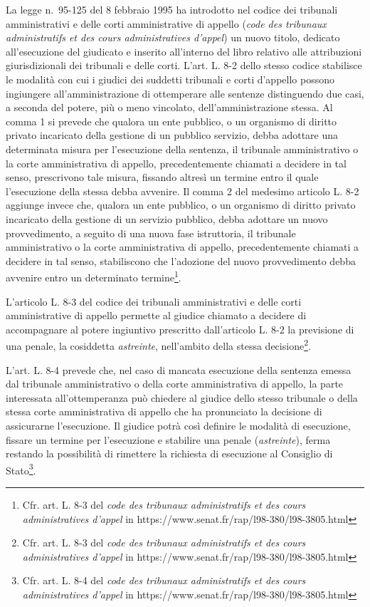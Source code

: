 \documentclass[12pt,it,a4paper,]{report}
\begin{document}
La legge n.~95-125 del 8 febbraio 1995 ha introdotto nel codice dei
tribunali amministrativi e delle corti amministrative di appello
(\emph{code des tribunaux administratifs et des cours administratives
d'appel}) un nuovo titolo, dedicato all'esecuzione del giudicato e
inserito all'interno del libro relativo alle attribuzioni
giurisdizionali dei tribunali e delle corti. L'art. L. 8-2 dello stesso
codice stabilisce le modalità con cui i giudici dei suddetti tribunali e
corti d'appello possono ingiungere all'amministrazione di ottemperare
alle sentenze distinguendo due casi, a seconda del potere, più o meno
vincolato, dell'amministrazione stessa. Al comma 1 si prevede che
qualora un ente pubblico, o un organismo di diritto privato incaricato
della gestione di un pubblico servizio, debba adottare una determinata
misura per l'esecuzione della sentenza, il tribunale amministrativo o la
corte amministrativa di appello, precedentemente chiamati a decidere in
tal senso, prescrivono tale misura, fissando altresì un termine entro il
quale l'esecuzione della stessa debba avvenire. Il comma 2 del medesimo
articolo L. 8-2 aggiunge invece che, qualora un ente pubblico, o un
organismo di diritto privato incaricato della gestione di un servizio
pubblico, debba adottare un nuovo provvedimento, a seguito di una nuova
fase istruttoria, il tribunale amministrativo o la corte amministrativa
di appello, precedentemente chiamati a decidere in tal senso,
stabiliscono che l'adozione del nuovo provvedimento debba avvenire entro
un determinato termine\footnote{Cfr. art. L. 8-3 del \emph{code des
  tribunaux administratifs et des cours administratives d'appel} in
  https://www.senat.fr/rap/l98-380/l98-3805.html}.

L'articolo L. 8-3 del codice dei tribunali amministrativi e delle corti
amministrative di appello permette al giudice chiamato a decidere di
accompagnare al potere ingiuntivo prescritto dall'articolo L. 8-2 la
previsione di una penale, la cosiddetta \emph{astreinte}, nell'ambito
della stessa decisione\footnote{Cfr. art. L. 8-3 del \emph{code des
  tribunaux administratifs et des cours administratives d'appel} in
  https://www.senat.fr/rap/l98-380/l98-3805.html}.

L'art. L. 8-4 prevede che, nel caso di mancata esecuzione della sentenza
emessa dal tribunale amministrativo o della corte amministrativa di
appello, la parte interessata all'ottemperanza può chiedere al giudice
dello stesso tribunale o della stessa corte amministrativa di appello
che ha pronunciato la decisione di assicurarne l'esecuzione. Il giudice
potrà così definire le modalità di esecuzione, fissare un termine per
l'esecuzione e stabilire una penale (\emph{astreinte}), ferma restando
la possibilità di rimettere la richiesta di esecuzione al Consiglio di
Stato\footnote{Cfr. art. L. 8-4 del \emph{code des tribunaux
  administratifs et des cours administratives d'appel} in
  https://www.senat.fr/rap/l98-380/l98-3805.html}.
\end{document}
